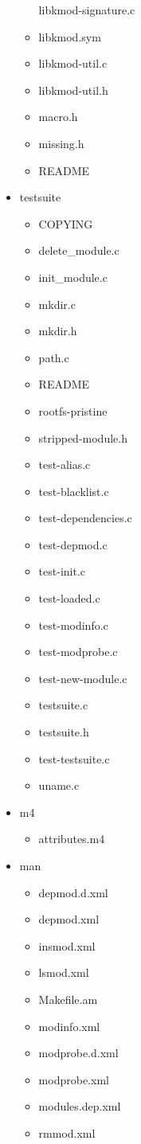 \documentclass[11pt,a4paper]{article}
\begin{document}
\begin{itemize}
\begin{itemize}
    libkmod-signature.c
  \item
    libkmod.sym
  \item
    libkmod-util.c
  \item
    libkmod-util.h
  \item
    macro.h
  \item
    missing.h
  \item
    README
  \end{itemize}
\item
  testsuite
  \begin{itemize}
  \item
    COPYING
  \item
    delete\_module.c
  \item
    init\_module.c
  \item
    mkdir.c
  \item
    mkdir.h
  \item
    path.c
  \item
    README
  \item
    rootfs-pristine
  \item
    stripped-module.h
  \item
    test-alias.c
  \item
    test-blacklist.c
  \item
    test-dependencies.c
  \item
    test-depmod.c
  \item
    test-init.c
  \item
    test-loaded.c
  \item
    test-modinfo.c
  \item
    test-modprobe.c
  \item
    test-new-module.c
  \item
    testsuite.c
  \item
    testsuite.h
  \item
    test-testsuite.c
  \item
    uname.c
  \end{itemize}
\item
  m4
  \begin{itemize}
  \item
    attributes.m4
  \end{itemize}
\item
  man
  \begin{itemize}
  \item
    depmod.d.xml
  \item
    depmod.xml
  \item
    insmod.xml
  \item
    lsmod.xml
  \item
    Makefile.am
  \item
    modinfo.xml
  \item
    modprobe.d.xml
  \item
    modprobe.xml
  \item
    modules.dep.xml
  \item
    rmmod.xml
  \end{itemize}
\end{itemize}
\end{document}
